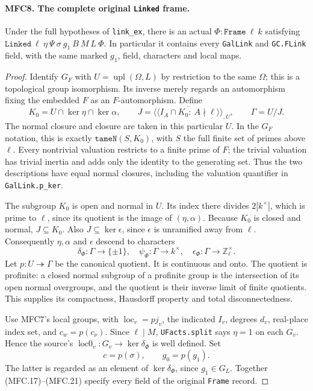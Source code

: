 \paragraph{MFC8. The complete original \texttt{Linked} frame.}
\label{claim:MFC8}
Under the full hypotheses of \texttt{link\_ex}, there is an
actual \(\Phi:\texttt{Frame}\ \ell\ k\) satisfying
\(\texttt{Linked}\ \ell\ \eta\ \Psi\ \sigma\ g_1\ B\ M\ L\ \Phi\).
In particular it contains every \texttt{GalLink} and
\texttt{GC.FLink} field, with the same marked \(g_1\), field,
characters and local maps.

\begin{proof}
Identify \(G_F\) with \(U=\operatorname{upl}(\Omega,L)\)
by restriction to the same \(\Omega\); this is a topological
group isomorphism.  Its inverse merely regards an automorphism
fixing the embedded \(F\) as an \(F\)-automorphism.  Define
\[
 K_0=U\cap\ker\eta\cap\ker\alpha,
 \qquad
 J=\overline{\langle\!\langle
       I_A\cap K_0:\ A\nmid\ell
                   \rangle\!\rangle}_{,U},\qquad
                         \Gamma=U/J.                      \tag{MFC.19}
\]
The normal closure and closure are taken in this particular \(U\).
In the \(G_F\) notation, this is exactly
\(\texttt{tameN}(S,K_0)\), with \(S\) the full finite set
of primes above \(\ell\).  Every nontrivial valuation restricts
to a finite prime of \(F\); the trivial valuation has trivial
inertia and adds only the identity to the generating set.
Thus the two descriptions have equal normal closures, including
the valuation quantifier in \texttt{GalLink.p\_ker}.

The subgroup \(K_0\) is open and normal in \(U\).  Its index there divides
\(2|k^\times|\), which is prime to \(\ell\), since its
quotient is the image of \((\eta,\alpha)\).  Because \(K_0\)
is closed and normal, \(J\subseteq K_0\).  Also
\(J\subseteq\ker\epsilon\), since \(\epsilon\) is
unramified away from \(\ell\).  Consequently \(\eta,\alpha\)
and \(\epsilon\) descend to characters
\[
 \delta_\Phi:\Gamma\to\{\pm1\},\quad
 \psi_\Phi:\Gamma\to k^\times,\quad
 \epsilon_\Phi:\Gamma\to\mathbb Z_\ell^\times.            \tag{MFC.20}
\]
Let \(p:U\twoheadrightarrow\Gamma\) be the canonical quotient.
It is continuous and onto.  The quotient is profinite: a closed
normal subgroup of a profinite group is the intersection of its
open normal overgroups, and the quotient is their inverse limit
of finite quotients.  This supplies its compactness, Hausdorff
property and total disconnectedness.

Use MFC7's local groups, with \(\operatorname{loc}_v=pj_v\),
the indicated \(I_v\), degrees \(d_v\), real-place index set,
and \(c_w=p(c_\nu)\).  Since \(\ell\mid M\), \texttt{UFacts.split}
says \(\eta=1\) on each \(G_v\).  Hence the source's
\(\operatorname{loc0}_v:G_v\to\ker\delta_\Phi\) is well
defined.  Set
\[
                    c=p(\sigma),\qquad g_0=p(g_1).
                                                               \tag{MFC.21}
\]
The latter is regarded as an element of \(\ker\delta_\Phi\),
since \(g_1\in G_L\).  Together (MFC.17)--(MFC.21) specify
every field of the original \texttt{Frame} record.


\end{proof}
